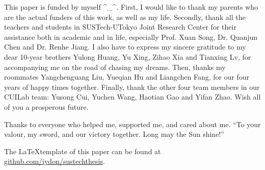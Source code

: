
This paper is funded by myself \^{}\_\^{}. First, I would like to thank my parents who are the actual funders of this work, as well as my life. Secondly, thank all the teachers and students in SUSTech-UTokyo Joint Research Center for their assistance both in academic and in life, especially Prof. Xuan Song, Dr. Quanjun Chen and Dr. Renhe Jiang. I also have to express my sincere gratitude to my dear 10-year brothers Yulong Huang, Yu Xing, Zihao Xia and Tianxing Lv, for accompanying me on the road of chasing my dreams. Then, thanks my roommates Yangchenguang Liu, Yueqian Hu and Liangchen Fang, for our four years of happy times together. Finally, thank the other four team members in our CUILab team: Yusong Cui, Yuchen Wang, Haotian Gao and Yifan Zhao. Wish all of you a prosperous future.

Thanks to everyone who helped me, supported me, and cared about me. ``To your valour, my sword, and our victory together. Long may the Sun shine!''

\vspace{\baselineskip}

The \LaTeX template of this paper can be found at \href{https://github.com/iydon/sustechthesis}{github.com/iydon/sustechthesis}.